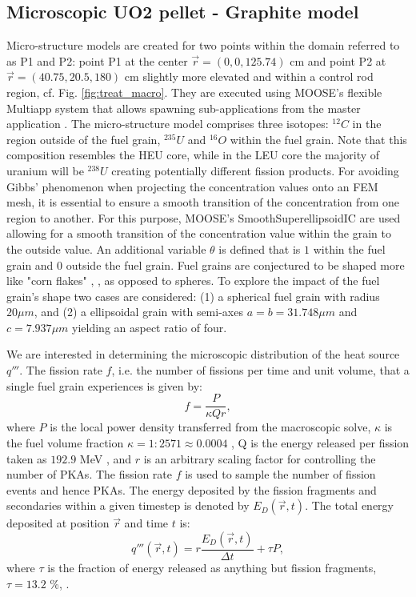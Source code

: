 \documentclass{anstrans}
\begin{document}
\subsection{Microscopic UO2 pellet - Graphite model}\label{sec:micro_model}
Micro-structure models are created for two points within the domain referred to as P1 and P2: point P1 at the center $\vec{r} = (0, 0, 125.74)$ cm and point P2 at $\vec{r} = (40.75, 20.5, 180)$ cm slightly more elevated and within a control rod region, cf. Fig. \ref{fig:treat_macro}. They are executed using MOOSE's flexible Multiapp system that allows spawning sub-applications from the master application \cite{Multiapp}.
The micro-structure model comprises three isotopes: $^{12}C$ in the region outside of the fuel grain, $^{235}U$ and $^{16}O$ within the fuel grain. Note that this composition resembles the HEU core, while in the LEU core the majority of uranium will be $^{238}U$ creating potentially different fission products.
For avoiding Gibbs' phenomenon when projecting the concentration values onto an FEM mesh, it is essential to ensure a smooth transition of the concentration from one region to another. For this purpose, MOOSE's SmoothSuperellipsoidIC are used allowing for a smooth transition of the concentration value within the grain to the outside value. An additional variable $\theta$ is defined that is $1$ within the fuel grain and $0$ outside the fuel grain.
Fuel grains are conjectured to be shaped more like "corn flakes" \cite{Mark}, \cite{GraphiteCore}, as opposed to spheres. To explore the impact of the fuel grain's shape two cases are considered: (1) a spherical fuel grain with radius $20 \mu m$, and (2) a ellipsoidal grain with semi-axes $a=b=31.748 \mu m$ and $c=7.937 \mu m$ yielding an aspect ratio of four.

We are interested in determining the microscopic distribution of the heat source $q'''$. The fission rate $f$, i.e. the number of fissions per time and unit volume, that a single fuel grain experiences is given by:
\begin{equation}
  f = \frac{P}{\kappa Q r},
\end{equation}
where $P$ is the local power density transferred from the macroscopic solve, $\kappa$ is the fuel volume fraction $\kappa = 1 : 2571 \approx 0.0004$ \cite{Mo2015}, Q is the energy released per fission taken as $192.9$ MeV \cite{DH}, and $r$ is an arbitrary scaling factor for controlling the number of PKAs. The fission rate $f$ is used to sample the number of fission events and hence PKAs. The energy deposited by the fission fragments and secondaries within a given timestep is denoted by $E_{D}(\vec{r}, t)$.
The total energy deposited at position $\vec{r}$ and time $t$ is:
\begin{equation}
   q'''(\vec{r},t) = r \frac{E_D(\vec{r},t)}{\Delta t} + \tau P,
\end{equation}
where $\tau$ is the fraction of energy released as anything but fission fragments, $\tau = 13.2$ \%, \cite{DH}.
\end{document}
